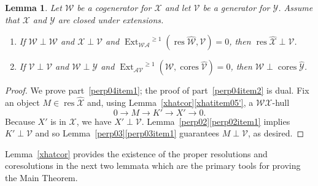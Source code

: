 \documentclass{amsart}
\newtheorem{lem}{Lemma}[section]
\begin{document}
\begin{lem} \label{perp04}
Let ${{\mathcal{{W}}}}$ be a cogenerator for ${{\mathcal{{X}}}}$ and 
let ${{\mathcal{{V}}}}$ be a generator for ${{\mathcal{{Y}}}}$.  Assume that
${{\mathcal{{X}}}}$ and ${{\mathcal{{Y}}}}$ are closed under extensions.
\begin{enumerate}[\quad\rm(a)]
\item \label{perp04item1}
If ${{\mathcal{{W}}}}\perp{{\mathcal{{W}}}}$ and ${{\mathcal{{X}}}}\perp{{\mathcal{{V}}}}$ and 
${{\operatorname{Ext}}_{{{\mathcal{{W}}}} {{\mathcal{{A}}}}}}^{{\geqslant} 1}({{\operatorname{res}{\widehat{{{\mathcal{{{W}}}}}}}}},{{\mathcal{{V}}}})=0$,
then ${{\operatorname{res}{\widehat{{{\mathcal{{{X}}}}}}}}}\perp{{\mathcal{{V}}}}$.
\item \label{perp04item2}
If ${{\mathcal{{V}}}}\perp{{\mathcal{{V}}}}$ and ${{\mathcal{{W}}}}\perp{{\mathcal{{Y}}}}$ and
${{\operatorname{Ext}}_{{{\mathcal{{A}}}}{{\mathcal{{V}}}}}}^{{\geqslant} 1}({{\mathcal{{W}}}},{{\operatorname{cores}{\widehat{{{\mathcal{{{V}}}}}}}}})=0$,
then ${{\mathcal{{W}}}}\perp{{\operatorname{cores}{\widehat{{{\mathcal{{{Y}}}}}}}}}$.
\end{enumerate}
\end{lem}

\begin{proof}
We prove part~\eqref{perp04item1}; the proof of part~\eqref{perp04item2}
is dual.
Fix an object $M\in{{\operatorname{res}{\widehat{{{\mathcal{{{X}}}}}}}}}$ and, using
Lemma~\ref{xhatcor}\eqref{xhatitem05'},  a ${{\mathcal{{W}}}}{{\mathcal{{X}}}}$-hull
$$0\to M\to K'\to X'\to 0.$$
Because $X'$ is in ${{\mathcal{{X}}}}$, we have $X'\perp{{\mathcal{{V}}}}$.
Lemma~\ref{perp02}\eqref{perp02item1}
implies $K'\perp{{\mathcal{{V}}}}$ and so Lemma~\ref{perp03}\eqref{perp03item1} guarantees
$M\perp{{\mathcal{{V}}}}$, as desired.
\end{proof}

Lemma~\ref{xhatcor} provides
the existence of the proper resolutions and coresolutions in the next two lemmata
which are the primary tools for proving the Main Theorem.
\end{document}
